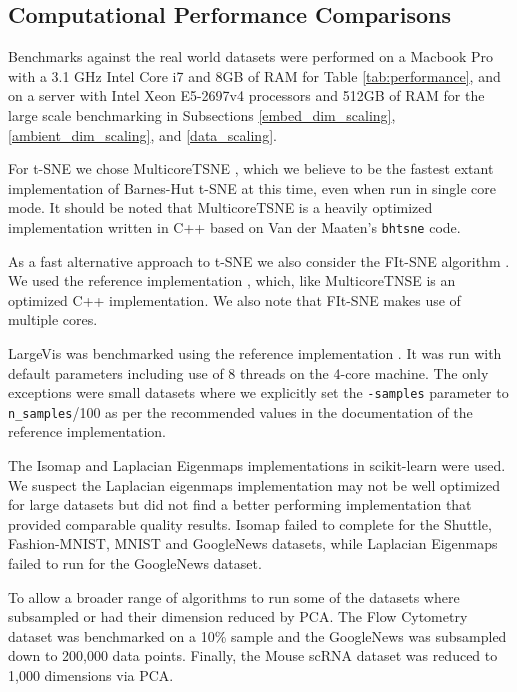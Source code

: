 \documentclass[12pt]{article}
\begin{document}
\subsection{Computational Performance Comparisons}\label{Computation Performance}

Benchmarks against the real world datasets were performed on a Macbook Pro with a 3.1 GHz Intel Core i7 and 8GB of RAM for Table \ref{tab:performance}, and on a server with Intel Xeon E5-2697v4 processors and 512GB of RAM for the large scale benchmarking in Subsections \ref{embed_dim_scaling}, \ref{ambient_dim_scaling}, and \ref{data_scaling}.

For t-SNE we chose MulticoreTSNE \cite{Ulyanov2016}, which we believe to be the fastest extant implementation of Barnes-Hut t-SNE at this time, even when run in single core mode. It should be noted that MulticoreTSNE is a heavily optimized implementation written in C++ based on Van der Maaten's \verb+bhtsne+ \cite{van2014accelerating} code.

As a fast alternative approach to t-SNE we also consider the FIt-SNE algorithm \cite{linderman2017efficient}. We used the reference implementation \cite{FItSNE2018}, which, like MulticoreTNSE is an optimized C++ implementation. We also note that FIt-SNE makes use of multiple cores.

LargeVis \cite{tang2016visualizing} was benchmarked using the reference implementation \cite{LFerry2016}. It was run with default parameters including use of 8 threads on the 4-core machine. The only exceptions were small datasets where we explicitly set the \texttt{-samples} parameter to \verb+n_samples+/100 as per the recommended values in the documentation of the reference implementation.

The Isomap \cite{tenenbaumISOMAP} and Laplacian Eigenmaps \cite{belkin2003laplacian} implementations in scikit-learn \cite{sklearn_api} were used. We suspect the Laplacian eigenmaps implementation may not be well optimized for large datasets but did not find a better performing implementation that provided comparable quality results. Isomap failed to complete for the Shuttle, Fashion-MNIST, MNIST and GoogleNews datasets, while Laplacian Eigenmaps failed to run for the GoogleNews dataset.

To allow a broader range of algorithms to run some of the datasets where subsampled or had their dimension reduced by PCA.  The Flow Cytometry dataset was benchmarked on a 10\% sample and the GoogleNews was subsampled down to 200,000 data points.  Finally, the Mouse scRNA dataset was reduced to 1,000 dimensions via PCA.
\end{document}
